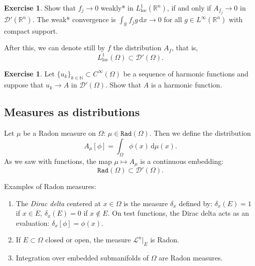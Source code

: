 \documentclass[a4paper,9pt]{amsart}
\newcommand{\scr}[1]{\mathscr{#1}}
\newcommand{\N}{\mathbb{N}}	%
\newcommand{\R}{\mathbb{R}}	%
\newcommand{\did}{\,\mathrm{d}}	%
\newcommand{\loc}{\mathrm{loc}}
\newcommand{\TODO}{{\bf\color{Red}TODO}}
\theoremstyle{plain}
\theoremstyle{definition}
\newtheorem{exercise}[proposition]{Exercise}%
\theoremstyle{remark}
\begin{document}
\begin{exercise}
	Show that $f_j\to 0$ weakly* in $L^1_\loc(\R^n)$, if and only if $A_{f_j}\to 0$ in $\scr D'(\R^n)$.
	The weak* convergence is $\int_\R f_j g \did x \to 0$ for all $g\in L^\infty(\R^n)$ with compact support.
\end{exercise}



After this, we can denote still by $f$ the distribution $A_f$, that is,
\begin{equation}
	L^1_\loc(\Omega) \subset \scr D'(\Omega) .
\end{equation}

\begin{exercise}
	Let $\{u_k\}_{k\in\N}\subset C^\infty(\Omega)$ be a sequence of harmonic functions
	and suppose that $u_k\to A$ in $\scr D'(\Omega)$.
	Show that $A$ is a harmonic function.
\end{exercise}

\subsection{Measures as distributions}\label{subs67def74c}
\newcommand{\radon}{\mathtt{Rad}}
Let $\mu$ be a Radon measure on $\Omega$: $\mu\in\radon(\Omega)$.
Then we define the distribution
\begin{equation}
	A_\mu[\phi] = \int_\Omega \phi(x) \did \mu(x) .
\end{equation}
As we saw with functions, the map $\mu\mapsto A_\mu$ is a continuous embedding:
\begin{equation}
	\radon(\Omega) \subset \scr D'(\Omega) .
\end{equation}

Examples of Radon measures:
\begin{enumerate}
\item The \emph{Dirac delta} centered at $x\in\Omega$ is the measure $\delta_x$ defined by: $\delta_x(E) = 1$ if $x\in E$, $\delta_x(E)=0$ if $x\notin E$.
On test functions, the Dirac delta acts as an evaluation: $\delta_x[\phi] = \phi(x)$.
\item If $E\subset\Omega$ closed or open, the measure $\scr L^n|_E$ is Radon.
\item Integration over embedded submanifolds of $\Omega$ are Radon measures.
\end{enumerate}
\end{document}
